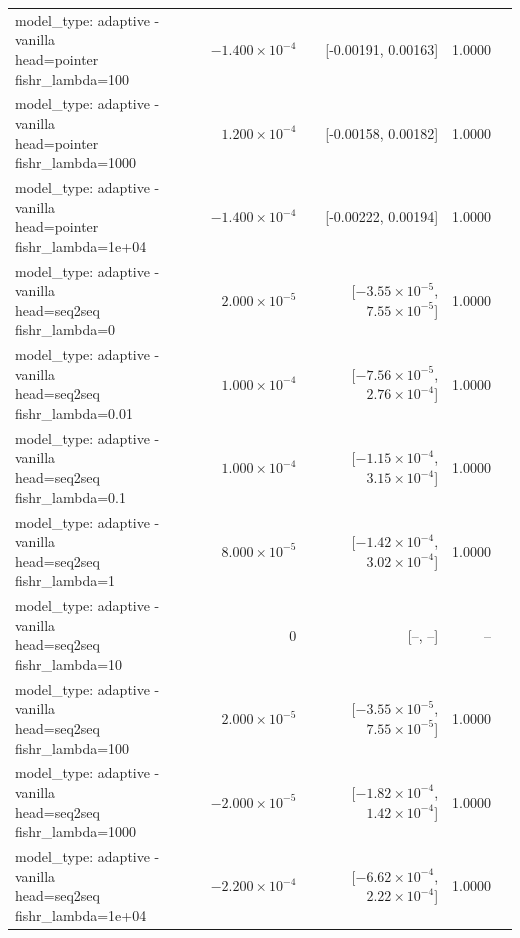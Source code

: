 \documentclass[10pt]{article}
\makeatletter
\newcommand{\stackcell}[1]{\begin{tabular}[t]{@{}l@{}}#1\end{tabular}}
\makeatother
\begin{document}
{\begin{longtable}{lrrrl}
\stackcell{model\_type: adaptive - vanilla\\\footnotesize head=pointer fishr\_lambda=100 } & $-1.400\times10^{-4}$ & [-0.00191, 0.00163] & 1.0000 & \\
\stackcell{model\_type: adaptive - vanilla\\\footnotesize head=pointer fishr\_lambda=1000 } & $1.200\times10^{-4}$ & [-0.00158, 0.00182] & 1.0000 & \\
\stackcell{model\_type: adaptive - vanilla\\\footnotesize head=pointer fishr\_lambda=1e+04 } & $-1.400\times10^{-4}$ & [-0.00222, 0.00194] & 1.0000 & \\
\stackcell{model\_type: adaptive - vanilla\\\footnotesize head=seq2seq fishr\_lambda=0 } & $2.000\times10^{-5}$ & [$-3.55\times10^{-5}$, $7.55\times10^{-5}$] & 1.0000 & \\
\stackcell{model\_type: adaptive - vanilla\\\footnotesize head=seq2seq fishr\_lambda=0.01 } & $1.000\times10^{-4}$ & [$-7.56\times10^{-5}$, $2.76\times10^{-4}$] & 1.0000 & \\
\stackcell{model\_type: adaptive - vanilla\\\footnotesize head=seq2seq fishr\_lambda=0.1 } & $1.000\times10^{-4}$ & [$-1.15\times10^{-4}$, $3.15\times10^{-4}$] & 1.0000 & \\
\stackcell{model\_type: adaptive - vanilla\\\footnotesize head=seq2seq fishr\_lambda=1 } & $8.000\times10^{-5}$ & [$-1.42\times10^{-4}$, $3.02\times10^{-4}$] & 1.0000 & \\
\stackcell{model\_type: adaptive - vanilla\\\footnotesize head=seq2seq fishr\_lambda=10 } & 0 & [--, --] & -- & \\
\stackcell{model\_type: adaptive - vanilla\\\footnotesize head=seq2seq fishr\_lambda=100 } & $2.000\times10^{-5}$ & [$-3.55\times10^{-5}$, $7.55\times10^{-5}$] & 1.0000 & \\
\stackcell{model\_type: adaptive - vanilla\\\footnotesize head=seq2seq fishr\_lambda=1000 } & $-2.000\times10^{-5}$ & [$-1.82\times10^{-4}$, $1.42\times10^{-4}$] & 1.0000 & \\
\stackcell{model\_type: adaptive - vanilla\\\footnotesize head=seq2seq fishr\_lambda=1e+04 } & $-2.200\times10^{-4}$ & [$-6.62\times10^{-4}$, $2.22\times10^{-4}$] & 1.0000 & \\

\end{longtable}}
\end{document}
